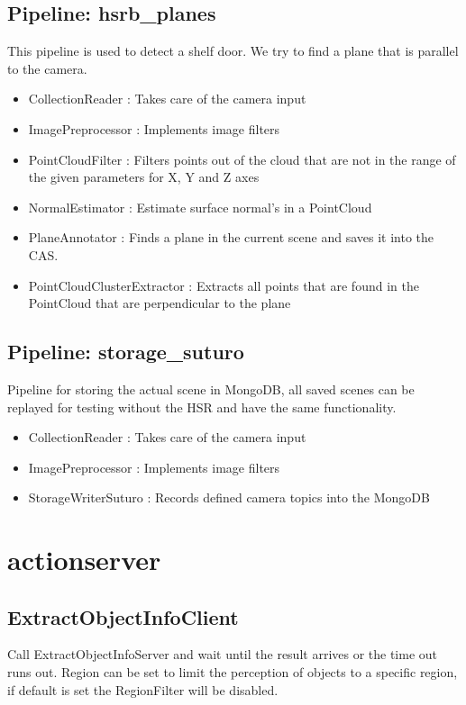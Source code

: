 \documentclass[main.tex]{subfiles}
\begin{document}
			\subsection{Pipeline: hsrb\_planes} 
This pipeline is used to detect a shelf door. We try to find a plane that is parallel to the camera.
\begin{itemize}
	\item CollectionReader : Takes care of the camera input
	\item ImagePreprocessor : Implements image filters  
	\item PointCloudFilter : Filters points out of the cloud that are not in the range of the given parameters for X, Y and Z axes
	\item NormalEstimator : Estimate surface normal's in a PointCloud 
	\item PlaneAnnotator : Finds a plane in the current scene and saves it into the CAS.
	\item PointCloudClusterExtractor : Extracts all points that are found in the PointCloud that are perpendicular to the plane 
\end{itemize}

			\subsection{Pipeline: storage\_suturo} 
Pipeline for storing the actual scene in MongoDB, all saved scenes can be replayed for testing without the HSR and have the same functionality. 
\begin{itemize}
	\item CollectionReader : Takes care of the camera input
	\item ImagePreprocessor : Implements image filters 
	\item StorageWriterSuturo :  Records defined camera topics into the MongoDB
\end{itemize}

		\section{actionserver}

			\subsection{ExtractObjectInfoClient}
Call ExtractObjectInfoServer and wait until the result arrives or the time out runs out. Region can be set to limit the perception of objects to a specific region, if default is set the RegionFilter will be disabled. 
\end{document}
